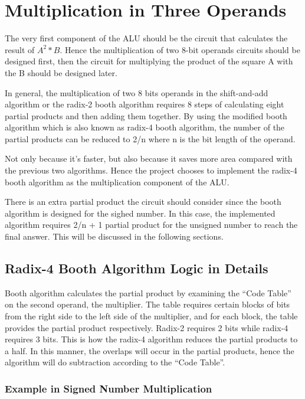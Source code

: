 \section{Multiplication in Three Operands}
The very first component of the ALU should be the circuit that calculates the result of
\textbf{\(A^2\ast B\)}.
Hence the multiplication of two 8-bit operands circuits should be designed first,
then the circuit for multiplying the product of the square A with the B should be designed later.

In general, the multiplication of two 8 bits operands in the shift-and-add algorithm or the radix-2 booth
algorithm requires 8 steps of calculating eight partial products and then adding them together.
By using the modified booth algorithm which is also known as radix-4 booth algorithm,
the number of the partial products can be reduced to 2/n where n is the bit length of the operand.

Not only because it’s faster, but also because it saves more area compared with the previous two algorithms.
Hence the project chooses to implement the radix-4 booth algorithm as the multiplication component of the ALU.

There is an extra partial product the circuit should consider since the booth algorithm is designed for the sighed number.
In this case, the implemented algorithm requires 2/n + 1 partial product for the unsigned number to reach the final answer.
This will be discussed in the following sections.

\subsection{Radix-4 Booth Algorithm Logic in Details}

Booth algorithm calculates the partial product by examining the “Code Table” on the second operand, the multiplier.
The table requires certain blocks of bits from the right side to the left side of the multiplier, and for each block,
the table provides the partial product respectively. Radix-2 requires 2 bits while radix-4 requires 3 bits.
This is how the radix-4 algorithm reduces the partial products to a half.
In this manner, the overlaps will occur in the partial products,
hence the algorithm will do subtraction according to the “Code Table”.

\subsubsection{Example in Signed Number Multiplication}

